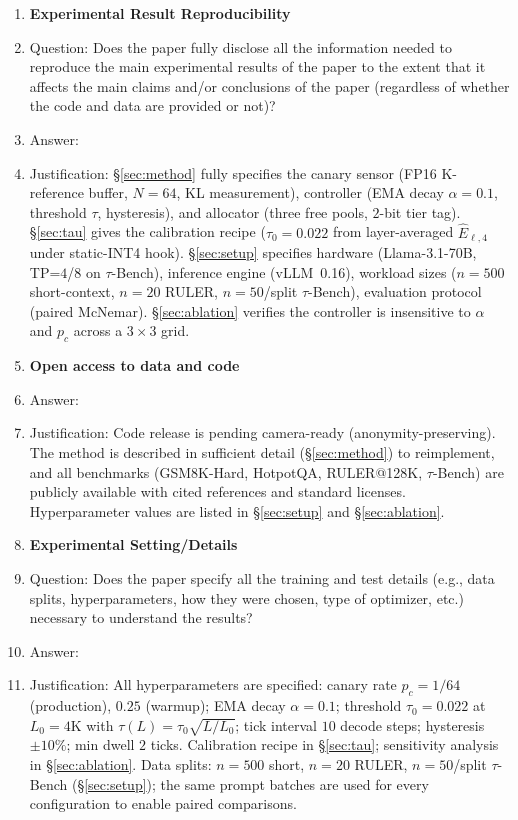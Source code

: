 \documentclass{article}
\begin{document}
\begin{enumerate}
\item {\bf Experimental Result Reproducibility}
\item[] Question: Does the paper fully disclose all the information needed to reproduce the main experimental results of the paper to the extent that it affects the main claims and/or conclusions of the paper (regardless of whether the code and data are provided or not)?
\item[] Answer: \answerYes{}
\item[] Justification: \S\ref{sec:method} fully specifies the canary sensor (FP16 K-reference buffer, $N{=}64$, KL measurement), controller (EMA decay $\alpha{=}0.1$, threshold $\tau$, hysteresis), and allocator (three free pools, $2$-bit tier tag). \S\ref{sec:tau} gives the calibration recipe ($\tau_0{=}0.022$ from layer-averaged $\widehat{E}_{\ell,4}$ under static-INT4 hook). \S\ref{sec:setup} specifies hardware (Llama-3.1-70B, TP=$4$/$8$ on $\tau$-Bench), inference engine (vLLM~0.16), workload sizes ($n{=}500$ short-context, $n{=}20$ RULER, $n{=}50$/split $\tau$-Bench), evaluation protocol (paired McNemar). \S\ref{sec:ablation} verifies the controller is insensitive to $\alpha$ and $p_c$ across a $3{\times}3$ grid.

\item {\bf Open access to data and code}
\item[] Answer: \answerNo{}
\item[] Justification: Code release is pending camera-ready (anonymity-preserving). The method is described in sufficient detail (\S\ref{sec:method}) to reimplement, and all benchmarks (GSM8K-Hard, HotpotQA, RULER@128K, $\tau$-Bench) are publicly available with cited references and standard licenses. Hyperparameter values are listed in \S\ref{sec:setup} and \S\ref{sec:ablation}.

\item {\bf Experimental Setting/Details}
\item[] Question: Does the paper specify all the training and test details (e.g., data splits, hyperparameters, how they were chosen, type of optimizer, etc.) necessary to understand the results?
\item[] Answer: \answerYes{}
\item[] Justification: All hyperparameters are specified: canary rate $p_c{=}1/64$ (production), $0.25$ (warmup); EMA decay $\alpha{=}0.1$; threshold $\tau_0{=}0.022$ at $L_0{=}4$K with $\tau(L){=}\tau_0\sqrt{L/L_0}$; tick interval $10$ decode steps; hysteresis $\pm 10\%$; min dwell $2$ ticks. Calibration recipe in \S\ref{sec:tau}; sensitivity analysis in \S\ref{sec:ablation}. Data splits: $n{=}500$ short, $n{=}20$ RULER, $n{=}50$/split $\tau$-Bench (\S\ref{sec:setup}); the same prompt batches are used for every configuration to enable paired comparisons.


\end{enumerate}
\end{document}
